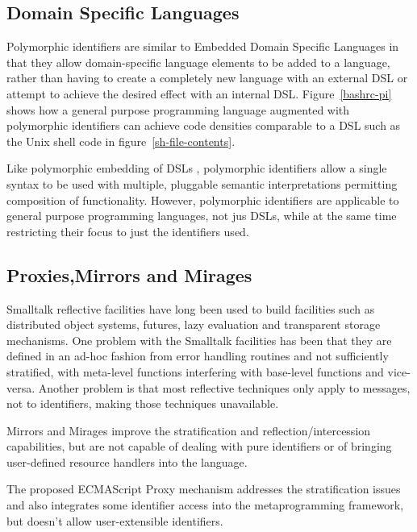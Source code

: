 \documentclass[preprint,authoryear]{acm_proc_article-sp}
\begin{document}
\subsection{Domain Specific Languages}

Polymorphic identifiers are similar to Embedded Domain Specific Languages\cite{edsl}
in that they allow domain-specific language elements to be added to a language, rather
than having to create a completely new language with an external DSL or attempt to 
achieve the desired effect with an internal DSL\cite{fowlerdsl}.   Figure~\ref{bashrc-pi} shows
how a general purpose programming language augmented with polymorphic
identifiers can achieve code densities comparable to a DSL such as the Unix
shell code in figure~\ref{sh-file-contents}.

Like polymorphic embedding of DSLs \cite{polydsl}, polymorphic identifiers allow
a single syntax to be used with multiple, pluggable semantic interpretations permitting
composition of functionality\cite{embeddeddsl}.  However, polymorphic identifiers
are applicable to general purpose programming languages, not jus DSLs, while
at the same time restricting their focus to just the identifiers used.

\subsection{Proxies,Mirrors and Mirages}

Smalltalk reflective facilities \cite{reflective-st} have long been used to build
facilities such as distributed object systems, futures, lazy evaluation and
transparent storage mechanisms.  One problem with the Smalltalk facilities
has been that they are defined in an ad-hoc fashion from error handling routines
and not sufficiently stratified, with meta-level functions
interfering with base-level functions and vice-versa.  Another problem is that
most reflective techniques only apply to messages, not to identifiers, making 
those techniques unavailable.

Mirrors \cite{mirrors} and Mirages \cite{mirages} improve the stratification and
reflection/intercession capabilities, but are not capable of dealing with pure
identifiers or of bringing user-defined resource handlers into the language.

The proposed ECMAScript Proxy mechanism \cite{VanCutsemMiller} addresses
the stratification issues and also integrates some identifier access into the 
metaprogramming framework, but doesn't allow user-extensible identifiers.
\end{document}
